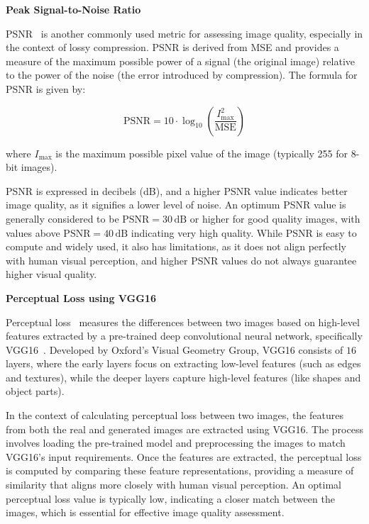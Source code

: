 \documentclass[12pt,DIV14,BCOR12mm,a4paper,footinclude=false,headinclude,parskip=half-,twoside,openright,cleardoublepage=empty,toc=index,bibliography=totoc,listof=totoc]{scrreprt}
\numberwithin{equation}{chapter}
\begin{document}
\textbf{Peak Signal-to-Noise Ratio}

PSNR~\cite{sara2019image} is another commonly used metric for assessing image quality, especially in the context of lossy compression. PSNR is derived from MSE and provides a measure of the maximum possible power of a signal (the original image) relative to the power of the noise (the error introduced by compression). The formula for PSNR is given by:

\begin{equation}
\text{PSNR} = 10 \cdot \log_{10}\left(\frac{I_{\text{max}}^2}{\text{MSE}}\right)
\end{equation}

where \( I_{\text{max}} \) is the maximum possible pixel value of the image (typically 255 for 8-bit images).

PSNR is expressed in decibels (dB), and a higher PSNR value indicates better image quality, as it signifies a lower level of noise. An optimum PSNR value is generally considered to be $\text{PSNR} = 30\,\text{dB}$ or higher for good quality images, with values above $\text{PSNR} = 40\,\text{dB}$ indicating very high quality. While PSNR is easy to compute and widely used, it also has limitations, as it does not align perfectly with human visual perception, and higher PSNR values do not always guarantee higher visual quality.

\textbf{Perceptual Loss using VGG16}

Perceptual loss~\cite{han2022perceptual, rad2019srobb} measures the differences between two images based on high-level features extracted by a pre-trained deep convolutional neural network, specifically VGG16~\cite{VGG16}. Developed by Oxford's Visual Geometry Group, VGG16 consists of $16$ layers, where the early layers focus on extracting low-level features (such as edges and textures), while the deeper layers capture high-level features (like shapes and object parts).

In the context of calculating perceptual loss between two images, the features from both the real and generated images are extracted using VGG16. The process involves loading the pre-trained model and preprocessing the images to match VGG16's input requirements. Once the features are extracted, the perceptual loss is computed by comparing these feature representations, providing a measure of similarity that aligns more closely with human visual perception. An optimal perceptual loss value is typically low, indicating a closer match between the images, which is essential for effective image quality assessment.
\end{document}
